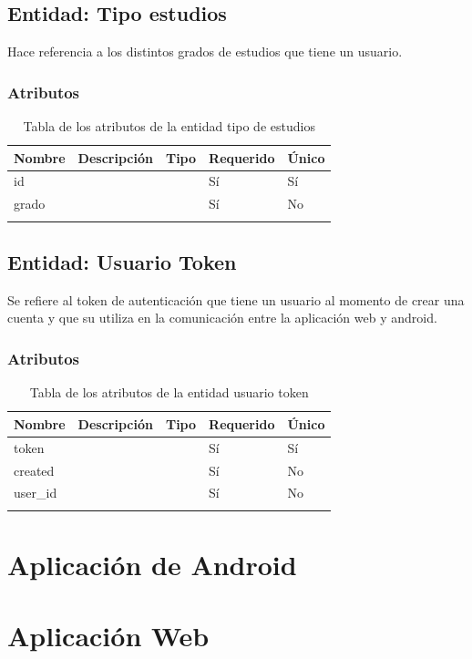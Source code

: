 \subsection{Entidad: Tipo estudios}
Hace referencia a los distintos grados de estudios que tiene un usuario.
\subsubsection{Atributos}
\begin{center}
	\begin{longtable}{|J{3cm}|J{4cm}|J{3cm}|J{2cm}|J{2cm}|}
		\hline
		\textbf{Nombre} & \textbf{Descripción} & \textbf{Tipo} & \textbf{Requerido} & \textbf{Único} \\ \hline
		id & & & Sí & Sí \\ \hline
		grado & & & Sí & No \\ \hline
		\caption{Tabla de los atributos de la entidad tipo de estudios}
		\label{tbl:entidad-tipo-estudios}
	\end{longtable}
\end{center}
\subsection{Entidad: Usuario Token}
Se refiere al token de autenticación que tiene un usuario al momento de crear una cuenta y que su utiliza en la comunicación entre la aplicación web y android.
\subsubsection{Atributos}
\begin{center}
	\begin{longtable}{|J{3cm}|J{4cm}|J{3cm}|J{2cm}|J{2cm}|}
		\hline
		\textbf{Nombre} & \textbf{Descripción} & \textbf{Tipo} & \textbf{Requerido} & \textbf{Único} \\ \hline
		token & & & Sí &  Sí\\ \hline
		created & & & Sí & No\\ \hline
		user\_id & & & Sí & No\\ \hline
		\caption{Tabla de los atributos de la entidad usuario token}
		\label{tbl:entidad-usuario-token}
	\end{longtable}
\end{center}

\section{Aplicación de Android}

\newpage
\section{Aplicación Web}

\newpage

\newpage

